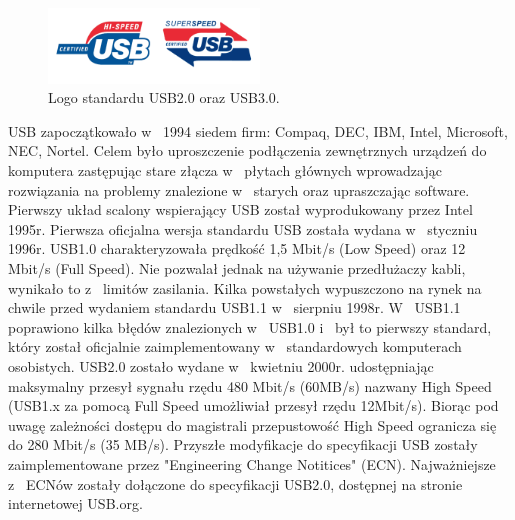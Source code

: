 \documentclass{BscUS}
\begin{document}
\begin{figure}[h]
\centering
\includegraphics[width=0.5\textwidth]{./img/usbLogo}
\caption{Logo standardu USB2.0 oraz USB3.0. \cite{usbLogo}}
\end{figure}
%
%
\indent USB zapoczątkowało w~ 1994 siedem firm: Compaq, DEC, IBM, Intel, Microsoft, NEC, Nortel. Celem było uproszczenie podłączenia zewnętrznych urządzeń do komputera zastępując stare złącza w~ płytach głównych wprowadzając rozwiązania na problemy znalezione w~ starych oraz upraszczając software.
Pierwszy układ scalony wspierający USB został wyprodukowany przez Intel 1995r.
\newline
\indent Pierwsza oficjalna wersja standardu USB została wydana w~ styczniu 1996r. USB1.0 charakteryzowała prędkość 1,5 Mbit/s (Low Speed) oraz 12 Mbit/s (Full Speed). Nie pozwalał jednak na używanie przedłużaczy kabli, wynikało to z~ limitów zasilania. %
Kilka powstałych wypuszczono na rynek na chwile przed wydaniem standardu USB1.1 w~ sierpniu 1998r. W~ USB1.1 poprawiono kilka błędów znalezionych w~ USB1.0 i~ był to pierwszy standard, który został oficjalnie zaimplementowany w~ standardowych komputerach osobistych. \cite{USBSystemArch}
\newline
\indent USB2.0 zostało wydane w~ kwietniu 2000r. udostępniając maksymalny przesył sygnału rzędu 480 Mbit/s (60MB/s) nazwany High Speed (USB1.x za pomocą Full Speed umożliwiał przesył rzędu 12Mbit/s). Biorąc pod uwagę zależności dostępu do magistrali przepustowość High Speed ogranicza się do 280 Mbit/s (35 MB/s).
Przyszłe modyfikacje do specyfikacji USB zostały zaimplementowane przez "Engineering Change Notitices" (ECN). Najważniejsze z~ ECNów zostały dołączone do specyfikacji USB2.0, dostępnej na stronie internetowej USB.org.
\end{document}
